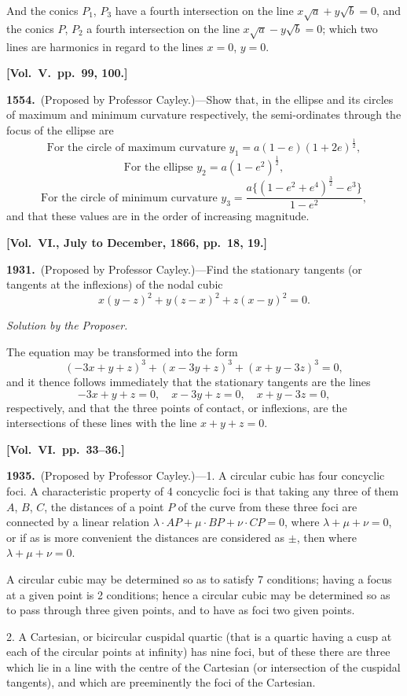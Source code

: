 \documentclass[11pt,a4paper]{article}
\theoremstyle{plain}
\theoremstyle{definition}
\theoremstyle{remark}
\begin{document}
And the conics $P_{1}$, $P_{3}$ have a fourth intersection on the line $x\sqrt{a}+y\sqrt{b}=0$, and the conics $P$, $P_{2}$ a fourth intersection on the line $x\sqrt{a}-y\sqrt{b}=0$; which two lines are harmonics in regard to the lines $x=0$, $y=0$.

\textbf{[Vol.\ V.\ pp.\ 99, 100.]}

\textbf{1554.}\ (Proposed by Professor Cayley.)---Show that, in the ellipse and its circles of maximum and minimum curvature respectively, the semi-ordinates through the focus of the ellipse are
\[
\text{For the circle of maximum curvature } y_{1}=a(1-e)(1+2e)^{\frac12},
\]
\[
\text{For the ellipse } y_{2}=a(1-e^{2})^{\frac12},
\]
\[
\text{For the circle of minimum curvature } y_{3}=\frac{a\{(1-e^{2}+e^{4})^{\frac32}-e^{3}\}}{1-e^{2}},
\]
and that these values are in the order of increasing magnitude.

\textbf{[Vol.\ VI., July to December, 1866, pp.\ 18, 19.]}

\textbf{1931.}\ (Proposed by Professor Cayley.)---Find the stationary tangents (or tangents at the inflexions) of the nodal cubic
\[
x(y-z)^{2}+y(z-x)^{2}+z(x-y)^{2}=0.
\]

\textit{Solution by the Proposer.}

The equation may be transformed into the form
\[
(-3x+y+z)^{3}+(x-3y+z)^{3}+(x+y-3z)^{3}=0,
\]
and it thence follows immediately that the stationary tangents are the lines
\[
-3x+y+z=0,\quad x-3y+z=0,\quad x+y-3z=0,
\]
respectively, and that the three points of contact, or inflexions, are the intersections of these lines with the line $x+y+z=0$.

\textbf{[Vol.\ VI.\ pp.\ 33--36.]}

\textbf{1935.}\ (Proposed by Professor Cayley.)---1. A circular cubic has four concyclic foci. A characteristic property of 4 concyclic foci is that taking any three of them $A$, $B$, $C$, the distances of a point $P$ of the curve from these three foci are connected by a linear relation $\lambda\cdot AP+\mu\cdot BP+\nu\cdot CP=0$, where $\lambda+\mu+\nu=0$, or if as is more convenient the distances are considered as $\pm$, then where $\lambda+\mu+\nu=0$.

A circular cubic may be determined so as to satisfy 7 conditions; having a focus at a given point is 2 conditions; hence a circular cubic may be determined so as to pass through three given points, and to have as foci two given points.

2. A Cartesian, or bicircular cuspidal quartic (that is a quartic having a cusp at each of the circular points at infinity) has nine foci, but of these there are three which lie in a line with the centre of the Cartesian (or intersection of the cuspidal tangents), and which are preeminently the foci of the Cartesian.
\end{document}
